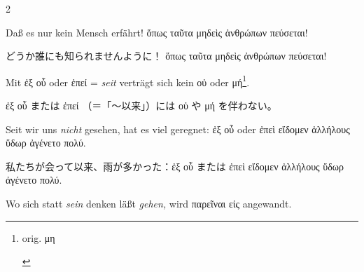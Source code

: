 \begin{paracol}{2}
\begin{enumerate}[leftmargin=0pt,rightmargin=0pt,listparindent =1cm,labelindent=1cm,labelsep=1ex,labelwidth={*},itemindent={*},align=left]
\begin{german}
\begin{continuousexamples}Daß es nur kein Mensch erfährt! \textgreek[variant=ancient]{ὅπως
ταῦτα μηδεὶς ἀνθρώπων πεύσεται!}\par\end{continuousexamples}
\end{german}
\switchcolumn

\begin{japanese}
どうか誰にも知られませんように！ \textgreek[variant=ancient]{ὅπως ταῦτα μηδεὶς ἀνθρώπων πεύσεται!}
\end{japanese}
\switchcolumn*

\begin{german}
\item Mit \textgreek[variant=ancient]{ἐξ οὗ} oder \textgreek[variant=ancient]{ἐπεί}
= \emph{seit} verträgt sich kein \textgreek[variant=ancient]{οὐ} oder
\textgreek[variant=ancient]{μή}\footnote{\begin{latin}%
orig. \textgreek[variant=ancient]{μη}\end{latin}%
}\textgreek[variant=ancient]{.}
\end{german}
\switchcolumn

\begin{japanese}
\textgreek[variant=ancient]{ἐξ οὗ} または \textgreek[variant=ancient]{ἐπεί}
（＝「〜以来」）には \textgreek[variant=ancient]{οὐ} や \textgreek[variant=ancient]{μή} を伴わない。
\end{japanese}
\switchcolumn*

\begin{german}
\begin{continuousexamples}Seit wir uns \emph{nicht} gesehen, hat
es viel geregnet: \textgreek[variant=ancient]{ἐξ οὗ }oder\textgreek[variant=ancient]{
ἐπεὶ εἴδομεν ἀλλήλους ὕδωρ ἀγένετο πολύ.}\par\end{continuousexamples}
\end{german}
\switchcolumn

\begin{japanese}
私たちが会って以来、雨が多かった：\textgreek[variant=ancient]{ἐξ οὗ }または
\textgreek[variant=ancient]{ἐπεὶ εἴδομεν ἀλλήλους ὕδωρ ἀγένετο πολύ.}
\end{japanese}
\switchcolumn*

\begin{german}
\item Wo sich statt \emph{sein} denken läßt \emph{gehen,} wird \textgreek[variant=ancient]{παρεῖναι
εἰς} angewandt.
\end{german}
\switchcolumn


\end{enumerate}
\end{paracol}
